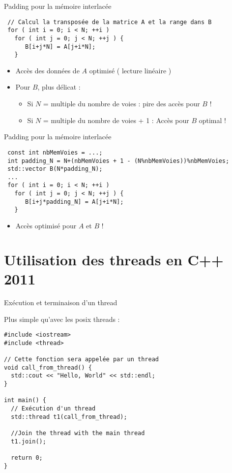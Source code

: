 \documentclass[handout,francais]{beamer}
\begin{document}
\begin{frame}[fragile]{Padding pour la mémoire interlacée}

\begin{lstlisting}
 // Calcul la transposée de la matrice A et la range dans B
 for ( int i = 0; i < N; ++i )
   for ( int j = 0; j < N; ++j ) {
      B[i+j*N] = A[j+i*N];
   }
\end{lstlisting}

\begin{itemize}
\item Accès des données de $A$ optimisé ( lecture linéaire )
\item Pour $B$, plus délicat :
  \begin{itemize}
  \item Si $N$ = multiple du nombre de voies : pire des accès pour $B$ !
  \item Si $N$ = multiple du nombre de voies + 1 : Accès pour $B$ optimal !
  \end{itemize}
\end{itemize}

\end{frame}

\begin{frame}[fragile]{Padding pour la mémoire interlacée}

\begin{lstlisting}
 const int nbMemVoies = ...;
 int padding_N = N+(nbMemVoies + 1 - (N%nbMemVoies))%nbMemVoies;
 std::vector B(N*padding_N);
 ...
 for ( int i = 0; i < N; ++i )
   for ( int j = 0; j < N; ++j ) {
      B[i+j*padding_N] = A[j+i*N];
   }
\end{lstlisting}

\begin{itemize}
 \item Accès optimisé pour $A$ et $B$ !
\end{itemize}

\end{frame}

\section{Utilisation des threads en C++ 2011}

\begin{frame}[fragile]{Exécution et terminaison d'un thread}

Plus simple qu'avec les posix threads :

\begin{lstlisting}
#include <iostream>
#include <thread>

// Cette fonction sera appelée par un thread
void call_from_thread() {
  std::cout << "Hello, World" << std::endl;
}

int main() {
  // Exécution d'un thread
  std::thread t1(call_from_thread);

  //Join the thread with the main thread
  t1.join();

  return 0;
}
\end{lstlisting}

\end{frame}
\end{document}
